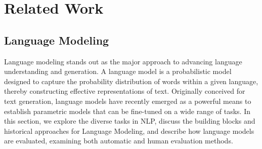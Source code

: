\chapter{Related Work}
\label{chapter:related}


\renewcommand{\leftmark}{\spacedlowsmallcaps{Related work}}


\minitoc






\section{Language Modeling}

Language modeling stands out as the major approach to advancing language understanding and generation. A language model is a probabilistic model designed to capture the probability distribution of words within a given language, thereby constructing effective representations of text. Originally conceived for text generation, language models have recently emerged as a powerful means to establish parametric models that can be fine-tuned on a wide range of tasks. 
In this section, we explore the diverse tasks in \ac{NLP}, discuss the building blocks and historical approaches for Language Modeling, and describe how language models are evaluated, examining both automatic and human evaluation methods.

